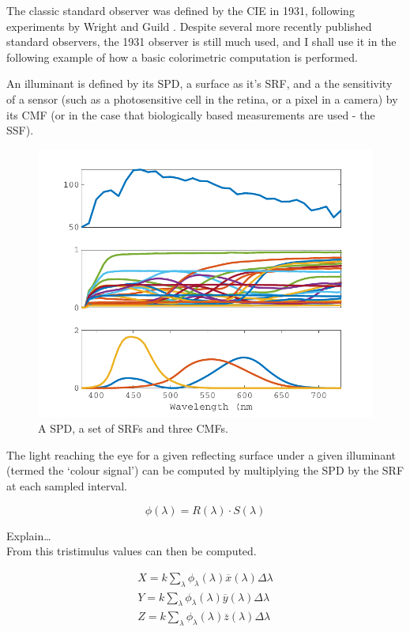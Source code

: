 The classic standard observer was defined by the CIE in 1931, following experiments by Wright and Guild \cite{wright_re-determination_1929, guild_colorimetric_1931}. Despite several more recently published standard observers, the 1931 observer is still much used, and I shall use it in the following example of how a basic colorimetric computation is performed.

An illuminant is defined by its \gls{SPD}, a surface as it's \gls{SRF}, and a the sensitivity of a sensor (such as a photosensitive cell in the retina, or a pixel in a camera) by its \gls{CMF} (or in the case that biologically based measurements are used - the \gls{SSF}).

\begin{figure}[htbp]
\includegraphics[max width=\textwidth]{figs/LitRev/SPDetc.pdf}
\caption{A \gls{SPD}, a set of \glspl{SRF} and three \glspl{CMF}.}
\label{fig:specFun}
\end{figure}

The light reaching the eye for a given reflecting surface under a given illuminant (termed the `colour signal') can be computed by multiplying the \gls{SPD} by the \gls{SRF} at each sampled interval.

\begin{equation}
\phi(\lambda)=R(\lambda) \cdot S(\lambda)
\end{equation}

Explain\dots \\
From this tristimulus values can then be computed.

\begin{subequations}
\begin{align}
X=k \sum_{\lambda} \phi_{\lambda}(\lambda) \overline{x}(\lambda) \Delta \lambda \\ 
Y=k \sum_{\lambda} \phi_{\lambda}(\lambda) \overline{y}(\lambda) \Delta \lambda \\ 
Z=k \sum_{\lambda} \phi_{\lambda}(\lambda) \overline{z}(\lambda) \Delta \lambda
\end{align}
\end{subequations}

